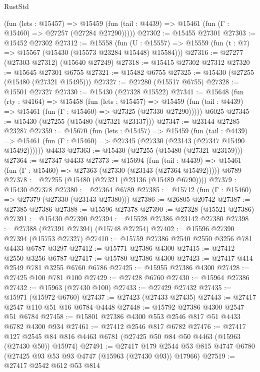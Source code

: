 \begin{lexlean}{RustStd}
\begin{coremodule}
{\begin{coremodule}
{{{{{{{{{{{{{{{{{{{{{{{{{{{{{{{{{{{{{{{{{{{{{{{{{{{{{{{{{{{{      (fun (lets : @15457) =>
      @15459 (fun (tail : @4439) => @15461 (fun (Γ : @15460) => @27257 (@27284 @27290)))))
@27302 := @15455 @27301
@27303 := @15452 @27302
@27312 := @15558
    (fun (U : @15557) => @15559 (fun (t : @7) => @15567 (@15430 (@15573 @23284 @15448) @15584)))
@27316 := @27277 (@27303 @27312) (@15640 @27249)
@27318 := @15415 @27302 @27312
@27320 := @15645 @27301 @6755
@27321 := @15482 @6755
@27325 := @15430 (@27255 (@15480 (@27321 @15495)))
@27327 := @27280 (@15517 @6755)
@27328 := @15501 @27327
@27330 := @15430 (@27328 @15522)
@27341 := @15648
    (fun (rty : @4164) =>
    @15458
      (fun (lets : @15457) =>
      @15459 (fun (tail : @4439) => @15461 (fun (Γ : @15460) => @27325 (@27330 @27290)))))
    @6025
@27345 := @15430 (@27255 (@15480 (@27321 @23137)))
@27347 := @23144 @27285 @23287
@27359 := @15670
    (fun (lets : @15457) =>
    @15459
      (fun (tail : @4439) =>
      @15461 (fun (Γ : @15460) => @27345 (@27330 (@23143 (@27347 @15490 @15492))))))
    @4433
@27363 := @15430 (@27255 (@15480 (@27321 @23159)))
@27364 := @27347 @4433
@27373 := @15694
    (fun (tail : @4439) => @15461 (fun (Γ : @15460) => @27363 (@27330 (@23143 (@27364 @15492)))))
    @6789
@27378 := @27255 (@15480 (@27321 (@23136 (@15489 @6790))))
@27379 := @15430 @27378
@27380 := @27364 @6789
@27385 := @15712 (fun (Γ : @15460) => @27379 (@27330 (@23143 @27380)))
@27386 := @26805 @20742
@27387 := @27385 @27386
@27388 := @15596 @27378
@27390 := @27328 (@15521 @27386)
@27391 := @15430 @27390
@27394 := @15528 @27386 @23142 @27380
@27398 := @27388 (@27391 @27394) (@15748 @27254)
@27402 := @15596 @27390 @27394 (@15753 @27327)
@27410 := @15759 @27386 @2540 @2550 @3256 @781 @4433 @6787 @3297
@27412 := @15771 @27386 @4300
@27415 := @27412 @2550 @3256 @6787
@27417 := @15780 @27386 @4300
@27423 := @27417 @414 @2549 @781 @3255 @6760 @6786
@27425 := @15955 @27386 @4300
@27428 := @27425 @100 @781 @100
@27429 := @27428 @6760
@27430 := @15964 @27386
@27432 := @15963 (@27430 @100)
@27433 := @27429 @27432
@27435 := @15971 (@15972 @6760)
@27437 := @27423 (@27433 @27435)
@27443 := @27417 @2547 @110 @51 @16 @6784 @4448
@27448 := @15792 @27386 @4300 @2547 @51 @6784
@27458 := @15801 @27386 @4300 @553 @2546 @817 @51 @4433 @6782 @4300 @934
@27461 := @27412 @2546 @817 @6782
@27476 := @27417
    @127
    @2545
    @84
    @816
    @4463
    @6781
    (@27425 @50 @84 @50 @4463 (@15963 (@27430 @50)) @15974)
@27491 := @27417
    @179
    @2544
    @53
    @815
    @4747
    @6780
    (@27425 @93 @53 @93 @4747 (@15963 (@27430 @93)) @17966)
@27519 := @27417
    @2542
    @612
    @53
    @814
}}}}}}}}}}}}}}}}}}}}}}}}}}}}}}}}}}}}}}}}}}}}}}}}}}}}}}}}}}}}
\end{coremodule}}
\end{coremodule}
\end{lexlean}

